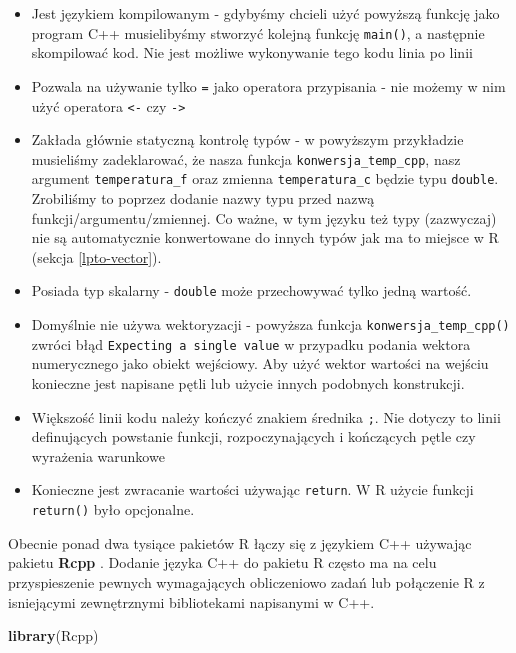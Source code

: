 \documentclass[paper=6in:9in,pagesize=pdftex,headinclude=on,footinclude=on,10pt]{scrbook}
\newenvironment{Shaded}{\begin{snugshade}}{\end{snugshade}}
\newcommand{\KeywordTok}[1]{\textcolor[rgb]{0.13,0.29,0.53}{\textbf{#1}}}
\newcommand{\NormalTok}[1]{#1}
\providecommand{\tightlist}{%
  \setlength{\itemsep}{0pt}\setlength{\parskip}{0pt}}
\begin{document}
\begin{itemize}
\tightlist
\item
  Jest językiem kompilowanym - gdybyśmy chcieli użyć powyższą funkcję jako program C++ musielibyśmy stworzyć kolejną funkcję \texttt{main()}, a następnie skompilować kod.
  Nie jest możliwe wykonywanie tego kodu linia po linii
\item
  Pozwala na używanie tylko \texttt{=} jako operatora przypisania - nie możemy w nim użyć operatora \texttt{\textless{}-} czy \texttt{-\textgreater{}}
\item
  Zakłada głównie statyczną kontrolę typów - w powyższym przykładzie musieliśmy zadeklarować, że nasza funkcja \texttt{konwersja\_temp\_cpp}, nasz argument \texttt{temperatura\_f} oraz zmienna \texttt{temperatura\_c} będzie typu \texttt{double}. Zrobiliśmy to poprzez dodanie nazwy typu przed nazwą funkcji/argumentu/zmiennej.
  Co ważne, w tym języku też typy (zazwyczaj) nie są automatycznie konwertowane do innych typów jak ma to miejsce w R (sekcja \ref{lpto-vector}).
\item
  Posiada typ skalarny - \texttt{double} może przechowywać tylko jedną wartość.
\item
  Domyślnie nie używa wektoryzacji - powyższa funkcja \texttt{konwersja\_temp\_cpp()} zwróci błąd \texttt{Expecting\ a\ single\ value} w przypadku podania wektora numerycznego jako obiekt wejściowy.
  Aby użyć wektor wartości na wejściu konieczne jest napisane pętli lub użycie innych podobnych konstrukcji.
\item
  Większość linii kodu należy kończyć znakiem średnika \texttt{;}.
  Nie dotyczy to linii definujących powstanie funkcji, rozpoczynających i kończących pętle czy wyrażenia warunkowe
\item
  Konieczne jest zwracanie wartości używając \texttt{return}.
  W R użycie funkcji \texttt{return()} było opcjonalne.
\end{itemize}

Obecnie ponad dwa tysiące pakietów R łączy się z językiem C++ używając pakietu \textbf{Rcpp} \citep{R-Rcpp}.
Dodanie języka C++ do pakietu R często ma na celu przyspieszenie pewnych wymagających obliczeniowo zadań lub połączenie R z isniejącymi zewnętrznymi bibliotekami napisanymi w C++.

\begin{Shaded}
\begin{Highlighting}[]
\KeywordTok{library}\NormalTok{(Rcpp)}
\end{Highlighting}
\end{Shaded}
\end{document}
